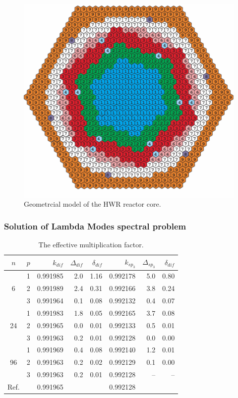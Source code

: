 \documentclass[authoryear]{elsarticle}
\begin{document}
\begin{figure}[h]
	\begin{center}
    		\includegraphics[width=0.9\linewidth] {hwr.png}
		\caption{Geometrcial model of the HWR reactor core.}
		\label{fig:hwr}
	\end{center}
\end{figure} 

\subsubsection{Solution of Lambda Modes spectral problem}
\begin{table}[H]
\caption{The effective multiplication factor.}
\label{tab:hwr_lambda}
\begin{center}
\begin{tabular}{c c r r r r r r}
\hline
$n$ & $p$ & $k_{dif}$ & $\Delta_{dif}$ & $\delta_{dif}$ &$k_{sp_3}$& $\Delta_{sp_3}$ & $\delta_{dif}$ \\
\hline
	& 1	& 0.991985&  2.0& 1.16&0.992178&   5.0& 0.80\\
6	& 2	& 0.991989&  2.4& 0.31&0.992166&   3.8& 0.24\\
	& 3	& 0.991964&  0.1& 0.08&0.992132&   0.4& 0.07\\
\hline
	& 1	& 0.991983&  1.8& 0.05&0.992165&   3.7& 0.08\\
24& 2	& 0.991965&  0.0& 0.01&0.992133&   0.5& 0.01\\
	& 3	& 0.991963&  0.2& 0.01&0.992128&   0.0& 0.00\\ 
\hline
	& 1	& 0.991969&  0.4& 0.08&0.992140&   1.2& 0.01\\
96& 2	& 0.991963&  0.2& 0.02&0.992129&   0.1& 0.00\\
	& 3	& 0.991963&  0.2& 0.01&0.992128&    --& --\\ 
\hline
Ref.&   & 0.991965&    & & 0.992128 & & \\ 
\hline
\end{tabular}
\end{center}
\end{table}
\end{document}
